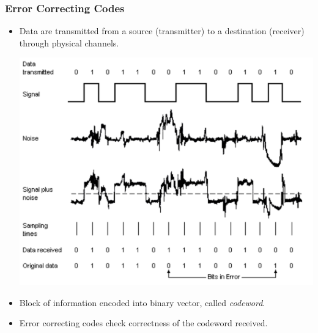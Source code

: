 \documentclass[9pt]{beamer}
\begin{document}
\begin{frame}
\frametitle{Error Correcting Codes}
\begin{itemize}
\item Data are transmitted from a source (transmitter) to a destination (receiver) through physical channels.

\begin{center}
\includegraphics[scale = 0.4]{impulse_noise.png}
\end{center}

\item Block of information encoded into binary vector, called \textit{codeword}.
\vspace{3mm}

\item Error correcting codes check correctness of the codeword received.

\end{itemize}
\end{frame}
\end{document}
